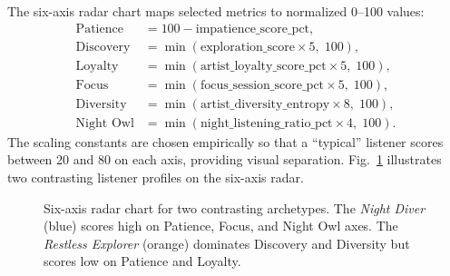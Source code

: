 \documentclass[conference]{IEEEtran}
\begin{document}
The six-axis radar chart maps selected metrics to normalized 0–100 values:
\begin{align*}
  \text{Patience}   &= 100 - \text{impatience\_score\_pct}, \\
  \text{Discovery}  &= \min(\text{exploration\_score} \times 5,\; 100), \\
  \text{Loyalty}    &= \min(\text{artist\_loyalty\_score\_pct} \times 5,\; 100), \\
  \text{Focus}      &= \min(\text{focus\_session\_score\_pct} \times 5,\; 100), \\
  \text{Diversity}  &= \min(\text{artist\_diversity\_entropy} \times 8,\; 100), \\
  \text{Night Owl}  &= \min(\text{night\_listening\_ratio\_pct} \times 4,\; 100).
\end{align*}
The scaling constants are chosen empirically so that a ``typical'' listener
scores between 20 and 80 on each axis, providing visual separation.
Fig.~\ref{fig:radar} illustrates two contrasting listener profiles
on the six-axis radar.

\begin{figure}[ht]
\centering
{}
\caption{Six-axis radar chart for two contrasting archetypes. The
\textit{Night Diver} (blue) scores high on Patience, Focus, and Night
Owl axes. The \textit{Restless Explorer} (orange) dominates Discovery
and Diversity but scores low on Patience and Loyalty.}
\label{fig:radar}
\end{figure}
\end{document}
